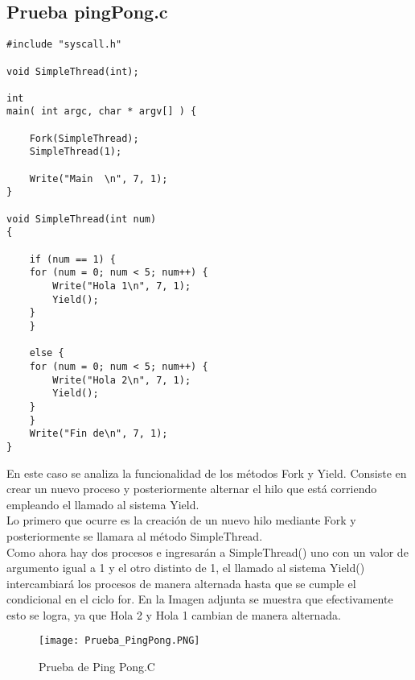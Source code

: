     \subsection{Prueba pingPong.c}
    \begin{lstlisting}
#include "syscall.h"

void SimpleThread(int);

int
main( int argc, char * argv[] ) {

    Fork(SimpleThread);
    SimpleThread(1);

    Write("Main  \n", 7, 1);
}

void SimpleThread(int num)
{

    if (num == 1) {
	for (num = 0; num < 5; num++) {
		Write("Hola 1\n", 7, 1);
		Yield();
	}
    }

    else {
	for (num = 0; num < 5; num++) {
		Write("Hola 2\n", 7, 1);
		Yield();
	}
    }
    Write("Fin de\n", 7, 1);
}
\end{lstlisting}
En este caso se analiza la funcionalidad de los métodos Fork y Yield. Consiste en crear un nuevo proceso y posteriormente alternar el hilo que está corriendo empleando el llamado al sistema Yield. \\
Lo primero que ocurre es la creación de un nuevo hilo mediante Fork y posteriormente se llamara al método SimpleThread.\\
Como ahora hay dos procesos e ingresarán a SimpleThread() uno con un valor de argumento igual a 1 y el otro distinto de 1, el llamado al sistema Yield() intercambiará los procesos de manera alternada hasta que se cumple el condicional en el ciclo for. En la Imagen adjunta se muestra que efectivamente esto se logra, ya que Hola 2 y Hola 1 cambian de manera alternada. 
 \begin{figure}[hbt]
      \begin{center}
        \texttt{[image: Prueba\_PingPong.PNG]}
        \caption{Prueba de Ping Pong.C}
        \label{fig:Fork}
      \end{center}
    \end{figure}
